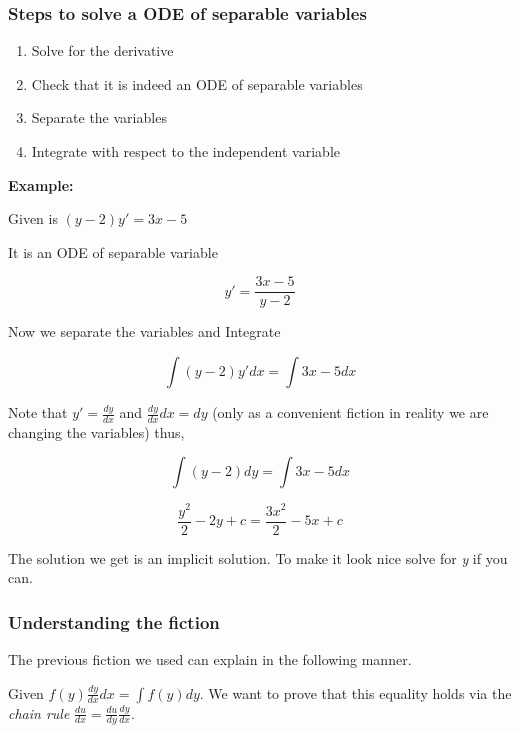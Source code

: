 \subsubsection{Steps to solve a ODE of separable variables}

\begin{enumerate}

    \item Solve for the derivative

    \item Check that it is indeed an ODE of separable variables

    \item Separate the variables

    \item Integrate with respect to the independent variable

\end{enumerate}

\textbf{Example:}
\vspace{\baselineskip}

Given is \((y - 2)y' = 3x - 5\)

It is an ODE of separable variable

\[
    y' = \frac{3x - 5}{y - 2}
\]

Now we separate the variables and Integrate

\[
    \int (y - 2)y' dx = \int 3x - 5 dx
\]

Note that \(y' = \frac{dy}{dx}\) and \( \frac{dy}{dx} dx = dy\) (only as a convenient fiction
in reality we are changing the variables) thus,

\[
    \int (y - 2)dy = \int 3x - 5 dx
\]

\[
    \frac{y^2}{2} - 2y + c = \frac{3x^2}{2} - 5x + c
\]

The solution we get is an implicit solution. To make it look nice solve for \emph{y}
if you can.

\subsubsection{Understanding the fiction}

The previous fiction we used can explain in the following manner.
\vspace{\baselineskip}

Given \( f(y) \frac{dy}{dx} dx = \int f(y) dy\). We want to prove that this equality holds via the 
\emph{chain rule} \(\frac{du}{dx} = \frac{du}{dy} \frac{dy}{dx}\).

